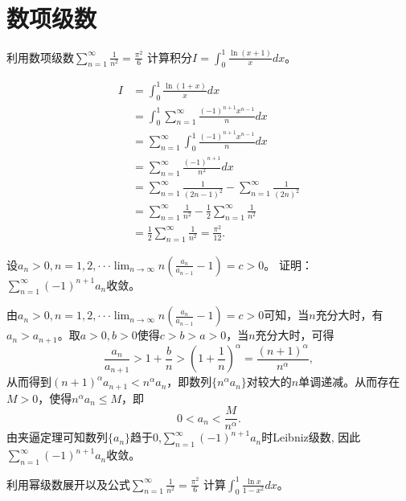  \section{数项级数}

  \begin{example}
  利用数项级数$\displaystyle\sum_{n=1}^{\infty}\frac 1{n^2}=\frac{\pi^2}6$
  计算积分$I=\int_0^1\frac{\ln(x+1)}xdx$。%
  \end{example} 

  \begin{solution}
  \begin{align*}
  I&=\int_0^1\frac{\ln(1+x)}{x}dx\\
  &=\int_0^1\sum_{n=1}^{\infty}\frac{(-1)^{n+1}x^{n-1}}{n}dx\\
  &=\sum_{n=1}^{\infty}\int_0^1\frac{(-1)^{n+1}x^{n-1}}{n}dx\\
  &=\sum_{n=1}^{\infty}\frac{(-1)^{n+1}}{n^2}dx\\
  &=\sum_{n=1}^{\infty}\frac{1}{(2n-1)^2}-\sum_{n=1}^{\infty}\frac{1}{(2n)^2}\\
  &=\sum_{n=1}^{\infty}\frac{1}{n^2}-\frac{1}{2}\sum_{n=1}^{\infty}\frac{1}{n^2}\\
  &=\frac{1}{2}\sum_{n=1}^{\infty}\frac{1}{n^2}=\frac{\pi^2}{12}.
  \end{align*}
  \end{solution}

  \begin{example}
  设$a_n>0,n=1,2,\cdot\cdot\cdot\lim_{n\rightarrow\infty}n(\frac{a_n}{a_{n-1}}-1)=c>0$。
  证明：$\displaystyle\sum_{n=1}^{\infty}(-1)^{n+1}a_n$收敛。%
  \end{example}  
  
  \begin{solution}
    由$\displaystyle a_n>0,n=1,2,\cdot\cdot\cdot\lim_{n\rightarrow\infty}n(\frac{a_n}{a_{n-1}}-1)=c>0$可知，当$n$充分大时，有$a_n>a_{n+1}$。取$a>0,b>0$使得$c>b>a>0$，当$n$充分大时，可得$$\frac{a_n}{a_{n+1}}>1+\frac{b}{n}>(1+\frac{1}{n})^{\alpha}=\frac{(n+1)^{\alpha}}{n^{\alpha}},$$
  从而得到$(n+1)^{\alpha}a_{n+1}<n^{\alpha}a_n$，即数列$\{n^{\alpha}a_n\}$对较大的$n$单调递减。从而存在$M>0$，使得$n^{\alpha}a_n\leq M$，即$$0<a_n<\frac{M}{n^{\alpha}}.$$
  由夹逼定理可知数列$\{a_n\}$趋于0,$\sum_{n=1}^{\infty}(-1)^{n+1}a_n$时Leibniz级数,
  因此$\sum_{n=1}^{\infty}(-1)^{n+1}a_n$收敛。  
  \end{solution}

  \begin{example}
  利用幂级数展开以及公式$\sum_{n=1}^{\infty}\frac1{n^2}=\frac{\pi^2}6$
  计算$\int_0^1\frac{\ln x}{1-x^2}dx$。    
  \end{example}  

